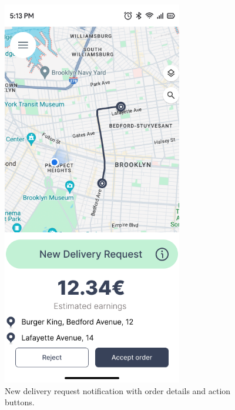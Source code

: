 \begin{figure}[h]
    \centering
    \includegraphics[width=0.7\textwidth]{images/delivery_request.png}
    \caption{New delivery request notification with order details and action buttons.}
    \label{fig:delivery_request}
\end{figure}

